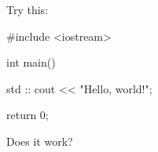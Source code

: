 Try this:
\begin{console}
#include <iostream>

int main()
{
    std    ::    cout << "Hello, world!\n";

    return 0;
}
\end{console}
Does it work?
